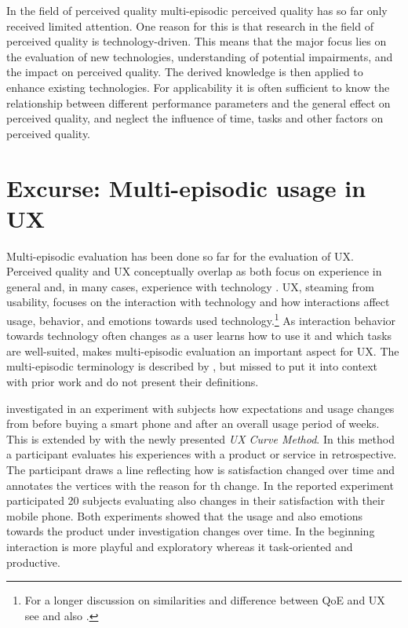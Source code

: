 In the field of perceived quality multi-episodic perceived quality has so far only received limited attention.
One reason for this is that research in the field of perceived quality is technology-driven.
This means that the major focus lies on the evaluation of new technologies, understanding of potential impairments, and the impact on perceived quality.
The derived knowledge is then applied to enhance existing technologies.
For applicability it is often sufficient to know the relationship between different performance parameters and the general effect on perceived quality, and neglect the influence of time, tasks and other factors on perceived quality.

\section{Excurse: Multi-episodic usage in \acl{UX}}
Multi-episodic evaluation has been done so far for the evaluation of \acf{UX}.
Perceived quality and \ac{UX} conceptually overlap as both focus on experience in general and, in many cases, experience with technology \citep[\cf][]{book chap 3}.
\ac{UX}, steaming from usability, focuses on the interaction with technology and how interactions affect usage, behavior, and emotions towards used technology.\footnote{For a longer discussion on similarities and difference between \ac{QoE} and \ac{UX} see \cite{book chapter 3} and also \cite{Hasenzahl 2008: towards user experience}.}
As interaction behavior towards technology often changes as a user learns how to use it and which tasks are well-suited, makes multi-episodic evaluation an important aspect for \ac{UX}.
The multi-episodic terminology is described by \citet[p. 8]{roto_user_2011}, but missed to put it into context with prior work and do not present their definitions.

\cite{karapanos_user_2009} investigated in an experiment with \unit[6]{subjects} how expectations and usage changes from before buying a smart phone and after an overall usage period of \unit[4]{weeks}. %
This is extended by \cite{kujala_ux_2011} with the newly presented \emph{UX Curve Method}.
In this method a participant evaluates his experiences with a product or service in retrospective.
The participant draws a line reflecting how is satisfaction changed over time and annotates the vertices with the reason for th change.
In the reported experiment participated 20 subjects evaluating also changes in their satisfaction with their mobile phone.
Both experiments showed that the usage and also emotions towards the product under investigation changes over time.
In the beginning interaction is more playful and exploratory whereas it task-oriented and productive.


